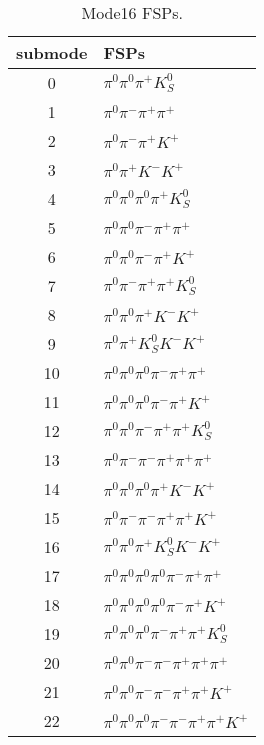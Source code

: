 \begin{table}[h!]
\begin{center}
\begin{tabular}{cl}
\hline
submode& FSPs\\
\hline
0 & $\pi^0 \pi^0 \pi^+ K_S^0 $ \\
1 & $\pi^0 \pi^- \pi^+ \pi^+ $ \\
2 & $\pi^0 \pi^- \pi^+ K^+ $ \\
3 & $\pi^0 \pi^+ K^- K^+ $ \\
4 & $\pi^0 \pi^0 \pi^0 \pi^+ K_S^0 $ \\
5 & $\pi^0 \pi^0 \pi^- \pi^+ \pi^+ $ \\
6 & $\pi^0 \pi^0 \pi^- \pi^+ K^+ $ \\
7 & $\pi^0 \pi^- \pi^+ \pi^+ K_S^0 $ \\
8 & $\pi^0 \pi^0 \pi^+ K^- K^+ $ \\
9 & $\pi^0 \pi^+ K_S^0 K^- K^+ $ \\
10 & $\pi^0 \pi^0 \pi^0 \pi^- \pi^+ \pi^+ $ \\
11 & $\pi^0 \pi^0 \pi^0 \pi^- \pi^+ K^+ $ \\
12 & $\pi^0 \pi^0 \pi^- \pi^+ \pi^+ K_S^0 $ \\
13 & $\pi^0 \pi^- \pi^- \pi^+ \pi^+ \pi^+ $ \\
14 & $\pi^0 \pi^0 \pi^0 \pi^+ K^- K^+ $ \\
15 & $\pi^0 \pi^- \pi^- \pi^+ \pi^+ K^+ $ \\
16 & $\pi^0 \pi^0 \pi^+ K_S^0 K^- K^+ $ \\
17 & $\pi^0 \pi^0 \pi^0 \pi^0 \pi^- \pi^+ \pi^+ $ \\
18 & $\pi^0 \pi^0 \pi^0 \pi^0 \pi^- \pi^+ K^+ $ \\
19 & $\pi^0 \pi^0 \pi^0 \pi^- \pi^+ \pi^+ K_S^0 $ \\
20 & $\pi^0 \pi^0 \pi^- \pi^- \pi^+ \pi^+ \pi^+ $ \\
21 & $\pi^0 \pi^0 \pi^- \pi^- \pi^+ \pi^+ K^+ $ \\
22 & $\pi^0 \pi^0 \pi^0 \pi^- \pi^- \pi^+ \pi^+ K^+ $ \\
\hline
\end{tabular}
\label{tab:Mode16FSPs}
\caption{Mode16 FSPs.}
\end{center}
\end{table}
